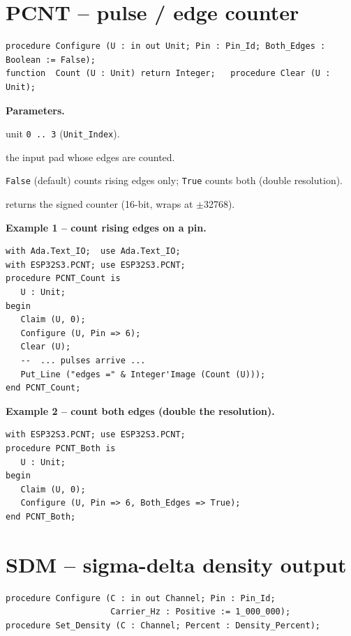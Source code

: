 \section{PCNT -- pulse / edge counter}

\begin{lstlisting}
procedure Configure (U : in out Unit; Pin : Pin_Id; Both_Edges : Boolean := False);
function  Count (U : Unit) return Integer;   procedure Clear (U : Unit);
\end{lstlisting}

\textbf{Parameters.}
\begin{description}[style=nextline]
\item[\texttt{Index}] unit \texttt{0\,..\,3} (\texttt{Unit\_Index}).
\item[\texttt{Pin}] the input pad whose edges are counted.
\item[\texttt{Both\_Edges}] \texttt{False} (default) counts rising edges only;
  \texttt{True} counts both (double resolution).
\item[\texttt{Count}] returns the signed counter (16-bit, wraps at $\pm$32768).
\end{description}

\textbf{Example 1 -- count rising edges on a pin.}
\begin{lstlisting}
with Ada.Text_IO;  use Ada.Text_IO;
with ESP32S3.PCNT; use ESP32S3.PCNT;
procedure PCNT_Count is
   U : Unit;
begin
   Claim (U, 0);
   Configure (U, Pin => 6);
   Clear (U);
   --  ... pulses arrive ...
   Put_Line ("edges =" & Integer'Image (Count (U)));
end PCNT_Count;
\end{lstlisting}

\textbf{Example 2 -- count both edges (double the resolution).}
\begin{lstlisting}
with ESP32S3.PCNT; use ESP32S3.PCNT;
procedure PCNT_Both is
   U : Unit;
begin
   Claim (U, 0);
   Configure (U, Pin => 6, Both_Edges => True);
end PCNT_Both;
\end{lstlisting}

\section{SDM -- sigma-delta density output}

\begin{lstlisting}
procedure Configure (C : in out Channel; Pin : Pin_Id;
                     Carrier_Hz : Positive := 1_000_000);
procedure Set_Density (C : Channel; Percent : Density_Percent);
\end{lstlisting}

